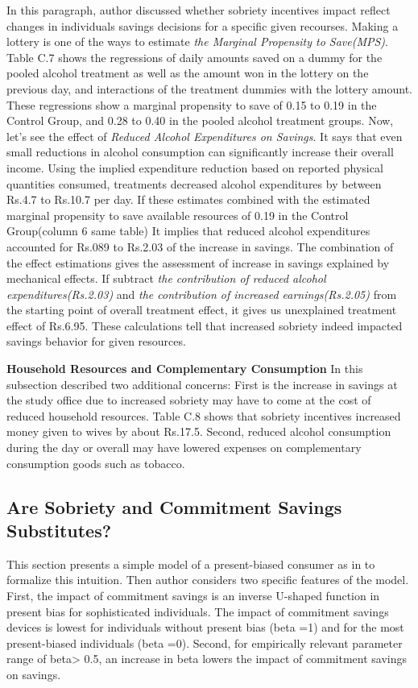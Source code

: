 \documentclass[a4paper,12pt]{article}
\begin{document}
In this paragraph, author discussed whether sobriety incentives impact reflect changes in individuals savings decisions for a specific given recourses. Making a lottery is one of the ways to estimate \textit{the Marginal Propensity to Save(MPS)}. Table C.7 shows the regressions of daily amounts saved on a dummy for the pooled alcohol treatment as well as the amount won in the lottery on the previous day, and interactions of the treatment dummies with the lottery amount. These regressions show a marginal propensity to save of 0.15 to 0.19 in the Control Group, and 0.28 to 0.40 in the pooled alcohol treatment groups. 
Now, let's see the effect of \textit{Reduced Alcohol Expenditures on Savings}. It says that even small reductions in alcohol consumption can significantly increase their overall income. Using the implied expenditure reduction based on reported physical quantities consumed, treatments decreased alcohol expenditures by between Rs.4.7 to Rs.10.7 per day. If these estimates combined with the estimated marginal propensity to save available resources of 0.19 in the Control Group(column 6 same table)
It implies that reduced alcohol expenditures accounted for Rs.089 to Rs.2.03 of the increase in savings. The combination of the effect estimations gives the assessment of increase in savings explained by mechanical effects. If subtract \textit{the contribution of reduced alcohol expenditures(Rs.2.03)} and \textit{the contribution of increased earnings(Rs.2.05)} from the starting point of overall treatment effect, it gives us unexplained treatment effect of Rs.6.95. These calculations tell that increased sobriety indeed impacted savings behavior for given resources. 
 
 \textbf{Household Resources and Complementary Consumption}
In this subsection described two additional concerns: First is the increase in savings at the study office due to increased sobriety may have to come at the cost of reduced household resources. Table C.8 shows that sobriety incentives increased money given to wives by about Rs.17.5. Second, reduced alcohol consumption during the day or overall may have lowered expenses on complementary consumption goods such as tobacco.  

\subsection{Are Sobriety and Commitment Savings Substitutes?}
This section presents a simple model of a present-biased consumer as in \cite{Laibson97} to formalize this intuition. Then author considers two specific features of the model. First, the impact of commitment savings is an inverse U-shaped function in present bias for sophisticated individuals. The impact of commitment savings devices is lowest for individuals without present bias (beta =1) and for the most present-biased individuals (beta =0). Second, for empirically relevant parameter range of beta> 0.5, an increase in beta lowers the impact of commitment savings on savings. 
\end{document}
